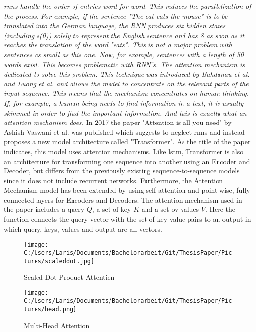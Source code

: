 \documentclass[a4paper, 11pt,titlepage,oneside,openany]{book}
\begin{document}
\textit{\noindent \gls{rnn}s handle the order of entries word for word. This reduces the parallelization of the process. For example, if the sentence "The cat eats the mouse" is to be translated into the German language, the RNN produces six hidden states (including s(0)) solely to represent the English sentence and has 8 as soon as it reaches the translation of the word "eats". This is not a major problem with sentences as small as this one. Now, for example, sentences with a length of 50 words exist. This becomes problematic with RNN's. The attention mechanism is dedicated to solve this problem. This technique was introduced by Bahdanau et al. \cite{bahdnau} and Luong et al. \cite{lunong} and allows the model to concentrate on the relevant parts of the input sequence. This means that the mechanism concentrates on human thinking. If, for example, a human being needs to find information in a text, it is usually skimmed in order to find the important information. And this is exactly what an attention mechanism does. }
\newpage
In 2017 the paper "Attention is all you need" by Ashish Vaswani et al.  \cite{attention} was published which suggests to neglect \gls{rnn}s and instead proposes a new model architecture called "Transformer". As the title of the paper indicates, this model uses attention mechanisms. Like \gls{lstm}, Transformer is also an architecture for transforming one sequence into another using an Encoder and Decoder, but differs from the previously existing sequence-to-sequence models since it does not include recurrent networks. Furthermore, the Attention Mechanism model has been extended by using self-attention and point-wise, fully connected layers for Encoders and Decoders.
The attention mechanism used in the paper includes a query $Q$, a set of key $K$ and a set ov values $V$. Here the function connects the query vector with the set of key-value pairs to an output in which query, keys, values and output are all vectors.\\
\begin{figure}[t]
	\begin{minipage}[b]{0.5\linewidth}
		\texttt{[image: C:/Users/Laris/Documents/Bachelorarbeit/Git/ThesisPaper/Pictures/scaleddot.jpg]}
		\caption{Scaled Dot-Product Attention}
	\end{minipage}
	\hfill
	\begin{minipage}[b]{0.5\linewidth}
		\texttt{[image: C:/Users/Laris/Documents/Bachelorarbeit/Git/ThesisPaper/Pictures/head.png]}
		\caption{Multi-Head Attention}
	\end{minipage}
\end{figure}
\end{document}
